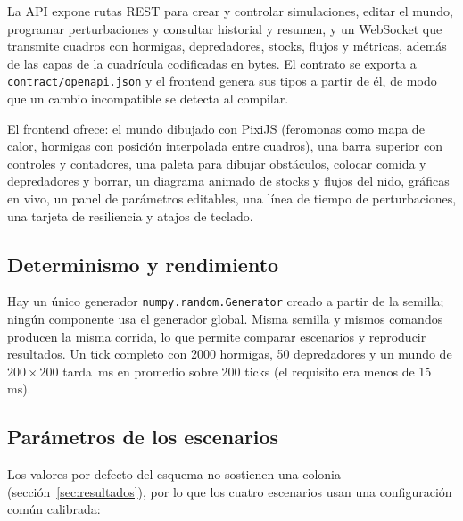 \documentclass[11pt,a4paper]{article}
\newcommand{\code}[1]{\texttt{\small #1}}
\begin{document}
La API expone rutas REST para crear y controlar simulaciones, editar el mundo, programar perturbaciones y consultar historial y resumen, y un WebSocket que transmite cuadros con hormigas, depredadores, stocks, flujos y métricas, además de las capas de la cuadrícula codificadas en bytes. El contrato se exporta a \code{contract/openapi.json} y el frontend genera sus tipos a partir de él, de modo que un cambio incompatible se detecta al compilar.

El frontend ofrece: el mundo dibujado con PixiJS (feromonas como mapa de calor, hormigas con posición interpolada entre cuadros), una barra superior con controles y contadores, una paleta para dibujar obstáculos, colocar comida y depredadores y borrar, un diagrama animado de stocks y flujos del nido, gráficas en vivo, un panel de parámetros editables, una línea de tiempo de perturbaciones, una tarjeta de resiliencia y atajos de teclado.

\subsection{Determinismo y rendimiento}

Hay un único generador \code{numpy.random.Generator} creado a partir de la semilla; ningún componente usa el generador global. Misma semilla y mismos comandos producen la misma corrida, lo que permite comparar escenarios y reproducir resultados. Un tick completo con 2000 hormigas, 50 depredadores y un mundo de $200\times200$ tarda \msportick\,ms en promedio sobre 200 ticks (el requisito era menos de 15\,ms).

\subsection{Parámetros de los escenarios}

Los valores por defecto del esquema no sostienen una colonia (sección~\ref{sec:resultados}), por lo que los cuatro escenarios usan una configuración común calibrada:
\end{document}
